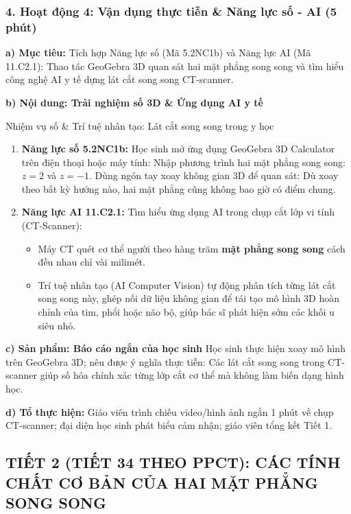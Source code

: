 \documentclass[12pt, a4paper]{article}
\begin{document}
\subsubsection*{4. Hoạt động 4: Vận dụng thực tiễn & Năng lực số - AI (5 phút)}

\noindent \textbf{a) Mục tiêu:}
Tích hợp Năng lực số (Mã 5.2NC1b) và Năng lực AI (Mã 11.C2.1): Thao tác GeoGebra 3D quan sát hai mặt phẳng song song và tìm hiểu công nghệ AI y tế dựng lát cắt song song CT-scanner.

\noindent \textbf{b) Nội dung: Trải nghiệm số 3D \& Ứng dụng AI y tế}
\begin{aibox}{Nhiệm vụ số & Trí tuệ nhân tạo: Lát cắt song song trong y học}
\begin{enumerate}[leftmargin=0.6cm]
    \item \textbf{Năng lực số 5.2NC1b:} Học sinh mở ứng dụng GeoGebra 3D Calculator trên điện thoại hoặc máy tính: Nhập phương trình hai mặt phẳng song song: $z = 2$ và $z = -1$. Dùng ngón tay xoay không gian 3D để quan sát: Dù xoay theo bất kỳ hướng nào, hai mặt phẳng cũng không bao giờ có điểm chung.
    \item \textbf{Năng lực AI 11.C2.1:} Tìm hiểu ứng dụng AI trong chụp cắt lớp vi tính (CT-Scanner):
    \begin{itemize}
        \item Máy CT quét cơ thể người theo hàng trăm \textbf{mặt phẳng song song} cách đều nhau chỉ vài milimét.
        \item Trí tuệ nhân tạo (AI Computer Vision) tự động phân tích từng lát cắt song song này, ghép nối dữ liệu không gian để tái tạo mô hình 3D hoàn chỉnh của tim, phổi hoặc não bộ, giúp bác sĩ phát hiện sớm các khối u siêu nhỏ.
    \end{itemize}
\end{enumerate}
\end{aibox}

\noindent \textbf{c) Sản phẩm: Báo cáo ngắn của học sinh}
Học sinh thực hiện xoay mô hình trên GeoGebra 3D; nêu được ý nghĩa thực tiễn: Các lát cắt song song trong CT-scanner giúp số hóa chính xác từng lớp cắt cơ thể mà không làm biến dạng hình học.

\noindent \textbf{d) Tổ thực hiện:}
Giáo viên trình chiếu video/hình ảnh ngắn 1 phút về chụp CT-scanner; đại diện học sinh phát biểu cảm nhận; giáo viên tổng kết Tiết 1.

\subsection*{TIẾT 2 (TIẾT 34 THEO PPCT): CÁC TÍNH CHẤT CƠ BẢN CỦA HAI MẶT PHẲNG SONG SONG}
\end{document}

